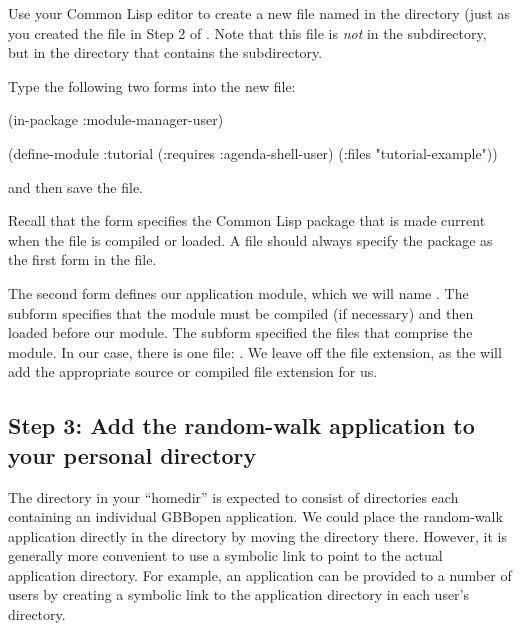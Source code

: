 \documentclass[10pt,twoside,english,pdftex]{article}
\begin{document}
Use your Common Lisp editor to create a new file named
 in the  directory (just as you
created the  file in Step 2 of
.  Note that this file is
\textit{not\/} in the  subdirectory, but in the 
directory that contains the  subdirectory.

Type the following two forms into the new 
file:
%
\W\supp
\begin{example}
  (in-package :module-manager-user)

  (define-module :tutorial
    (:requires :agenda-shell-user)
    (:files "tutorial-example"))
\end{example}
%
and then save the file.

Recall that the  form specifies the Common Lisp
package that is made current when the file is compiled or loaded.  A
 file should always specify the
 package as the first form in the file.

The second form defines our application module, which we will name
.  The  subform specifies that the
 module must be compiled (if necessary) and
then loaded before our  module.  The  subform
specified the files that comprise the module. In our case, there is one file:
.  We leave off the  file
extension, as the  will add the
appropriate source or compiled file extension for us.

\subsection*{Step 3: Add the random-walk application to your personal
   directory}

The  directory in your ``homedir'' is expected to
consist of directories each containing an individual GBBopen application.  We
could place the random-walk application directly in the
 directory by moving the 
directory there.  However, it is generally more convenient to use a symbolic
link to point to the actual application directory.  For example, an
application can be provided to a number of users by creating a symbolic link
to the application directory in each user's 
directory.
\end{document}
